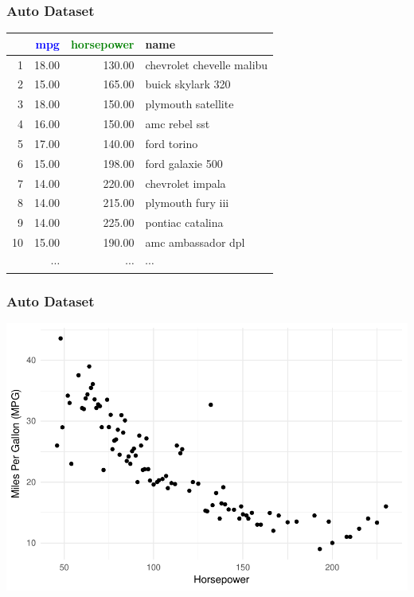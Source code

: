\documentclass{beamer}
\newcommand{\tc}[2]{\textcolor{#1}{#2}}
\newcommand{\tcb}[1]{\tc{blue}{#1}}
\newcommand{\tcg}[1]{\tc{green}{#1}}
\begin{document}
\begin{frame} \frametitle{Auto Dataset}
    \centering
    \begin{tabular}{rrrl}
            \hline
            & \tcb{mpg} & \tcg{horsepower} & name \\
            \hline
            1 & 18.00 & 130.00 & chevrolet chevelle malibu \\
            2 & 15.00 & 165.00 & buick skylark 320 \\
            3 & 18.00 & 150.00 & plymouth satellite \\
            4 & 16.00 & 150.00 & amc rebel sst \\
            5 & 17.00 & 140.00 & ford torino \\
            6 & 15.00 & 198.00 & ford galaxie 500 \\
            7 & 14.00 & 220.00 & chevrolet impala \\
            8 & 14.00 & 215.00 & plymouth fury iii \\
            9 & 14.00 & 225.00 & pontiac catalina \\
            10 & 15.00 & 190.00 & amc ambassador dpl \\
            & $\cdots$ & $\cdots$ & $\cdots$ \\
            \hline
    \end{tabular}
\end{frame}

\begin{frame} \frametitle{Auto Dataset}
    \centering
    \begin{center}\includegraphics[width=0.9\linewidth]{../figs/class1/auto_data.pdf}\end{center}
\end{frame}
\end{document}
